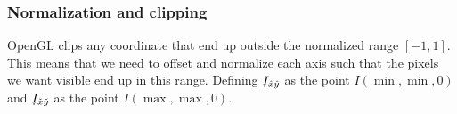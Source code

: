 





\subsubsection{Normalization and clipping}

OpenGL clips any coordinate that end up outside the normalized range $[-1,1]$. This means that we need to offset and normalize each axis such that the pixels we want visible end up in this range.
Defining $\udot{I}_{\hat{x}\hat{y}}$ as the point $I(\min,\min,0)$ and $\udot{I}_{\check{x}\check{y}}$ as the point $I(\max,\max,0)$.

